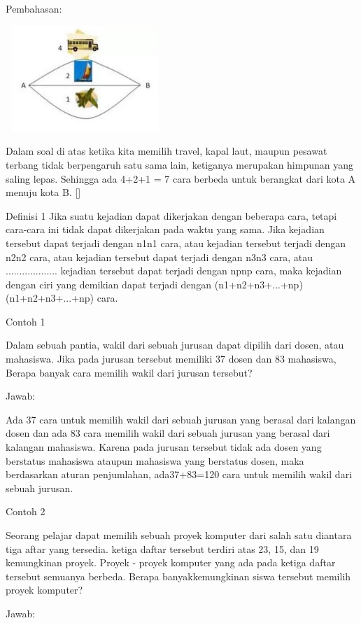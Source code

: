 \documentclass[11pt,fleqn]{book} %
\begin{document}
Pembahasan:


\includegraphics[width = 6cm, height= 4cm]{Pictures/contoh1.JPG}

	Dalam soal di atas ketika kita memilih travel, kapal laut, maupun pesawat terbang tidak berpengaruh satu sama lain, ketiganya merupakan himpunan yang saling lepas. Sehingga ada 4+2+1 = 7 cara berbeda untuk berangkat dari kota A menuju kota B. []

Definisi 1
Jika suatu kejadian dapat dikerjakan dengan beberapa cara, tetapi cara-cara ini tidak dapat dikerjakan pada waktu yang sama.
Jika kejadian tersebut dapat terjadi dengan n1n1 cara, atau
kejadian tersebut terjadi dengan n2n2 cara, atau
kejadian tersebut dapat terjadi dengan n3n3 cara, atau
...................
kejadian tersebut dapat terjadi dengan npnp cara,
maka kejadian dengan ciri yang demikian dapat terjadi dengan 
(n1+n2+n3+...+np)(n1+n2+n3+...+np) cara.

Contoh 1

Dalam sebuah pantia, wakil dari sebuah jurusan dapat dipilih dari dosen, atau mahasiswa. Jika pada jurusan tersebut memiliki 37 dosen dan 83 mahasiswa, Berapa banyak cara memilih wakil dari jurusan tersebut?

Jawab:

Ada 37 cara untuk memilih wakil dari sebuah jurusan yang berasal dari kalangan dosen dan ada 83 cara memilih wakil dari sebuah jurusan yang berasal dari kalangan mahasiswa. Karena pada jurusan tersebut tidak ada dosen yang berstatus mahasiswa ataupun mahasiswa yang berstatus dosen, maka berdasarkan aturan penjumlahan, ada37+83=120 cara untuk memilih wakil dari sebuah jurusan. 

Contoh 2

Seorang pelajar dapat memilih sebuah proyek komputer dari salah satu diantara tiga aftar yang tersedia. ketiga daftar tersebut terdiri atas 23, 15, dan 19 kemungkinan proyek. Proyek - proyek komputer yang ada pada ketiga daftar tersebut semuanya berbeda. Berapa banyakkemungkinan siswa tersebut memilih proyek komputer?

Jawab: 
\end{document}
